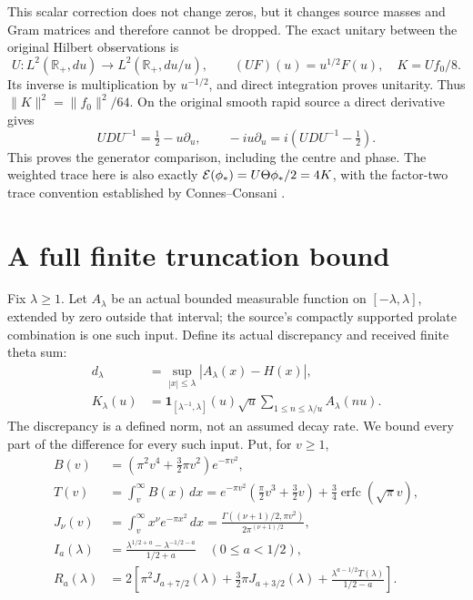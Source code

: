 \documentclass[11pt]{article}
\newcommand{\R}{\mathbb R}\newcommand{\C}{\mathbb C}
\begin{document}
This scalar correction does not change zeros, but it changes
source masses and Gram matrices and therefore cannot be dropped.
The exact unitary between the original Hilbert observations is
\begin{equation}\tag{PT6}
 U:L^2(\R_+,du)\longrightarrow L^2(\R_+,du/u),\qquad
 (UF)(u)=u^{1/2}F(u),\quad K=Uf_0/8.
\end{equation}
Its inverse is multiplication by $u^{-1/2}$, and direct integration
proves unitarity. Thus $\|K\|^2=\|f_0\|^2/64$.
On the original smooth rapid source a direct derivative gives
\begin{equation}\tag{PT7}
 UDU^{-1}=\tfrac12-u\partial_u,
 \qquad -iu\partial_u=i(UDU^{-1}-\tfrac12).
\end{equation}
This proves the generator comparison, including the centre and phase.
The weighted trace here is also exactly
$\mathcal E(\phi_*)=U\Theta\phi_*/2=4K$, with the factor-two trace
convention established by Connes--Consani \cite{Hochschild}.

\section{A full finite truncation bound}
Fix $\lambda\geq1$. Let $A_\lambda$ be an actual bounded measurable function
on $[-\lambda,\lambda]$, extended by zero outside that interval;
the source's compactly supported prolate combination is one such
input. Define its actual discrepancy and received finite theta sum:
\begin{equation}\tag{PT8}
 \begin{split}
 d_\lambda&=\sup_{|x|\leq\lambda}|A_\lambda(x)-H(x)|,\\
 K_\lambda(u)&=\mathbf1_{[\lambda^{-1},\lambda]}(u)\sqrt u
                 \sum_{1\leq n\leq\lambda/u}A_\lambda(nu).
 \end{split}
\end{equation}
The discrepancy is a defined norm, not an assumed decay rate.
We bound every part of the difference for every such input.
Put, for $v\geq1$,
\begin{equation}\tag{PT9}
 \begin{split}
 B(v)&=(\pi^2v^4+\tfrac32\pi v^2)e^{-\pi v^2},\\
 T(v)&=\int_v^\infty B(x)\,dx
   =e^{-\pi v^2}(\tfrac\pi2v^3+\tfrac32v)
                      +\tfrac34\operatorname{erfc}(\sqrt\pi v),\\
 J_\nu(v)&=\int_v^\infty x^\nu e^{-\pi x^2}\,dx
     =\frac{\Gamma((\nu+1)/2,\pi v^2)}{2\pi^{(\nu+1)/2}},\\
 I_a(\lambda)&=\frac{\lambda^{1/2+a}-\lambda^{-1/2-a}}{1/2+a}
                                     \quad(0\leq a<1/2),\\
 R_a(\lambda)&=2\left[\pi^2J_{a+7/2}(\lambda)
       +\tfrac32\pi J_{a+3/2}(\lambda)
       +\frac{\lambda^{a-1/2}T(\lambda)}{1/2-a}\right].
 \end{split}
\end{equation}
\end{document}
